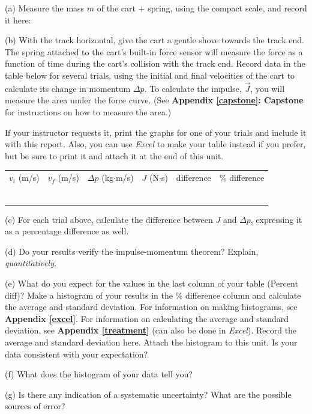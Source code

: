 (a) Measure the mass $m$ of the cart + spring, using the compact scale, and record it here:
\answerspace{10mm}

(b) With the track horizontal, give the cart a gentle shove towards the track end. The spring attached to the cart's built-in force sensor will measure the force as a function of time during the cart's collision with the track end. Record data in the table below for several trials, using the initial and final velocities of the cart to calculate its change in momentum $\Delta p$.  To calculate the impulse, ${\vec  J}$, you will measure the area under the force curve.  (See \textbf{Appendix \ref{capstone}: Capstone} for instructions on how to measure the area.)

If your instructor requests it, print the graphs for one of your trials and include it with this report.  Also, you can use {\it Excel} to make your table instead if you prefer, but be sure to print it and attach it at the end of this unit. 

\begin{center}
{\renewcommand{\arraystretch}{2.0}
\begin{tabular}{|c|c|c|C{0.8in}|c|C{1in}|} \hline 
$v_i$ (m/s) & $v_f$ (m/s) & $\Delta p$ (kg$\cdot$m/s) & $J$ (N$\cdot$s) & difference & \% difference \\ 
\hhline{|=|=|=|=|=|=|}
& & & & & \\ \hline 
& & & & & \\ \hline 
& & & & & \\ \hline 
& & & & & \\ \hline 
& & & & & \\ \hline 
& & & & & \\ \hline 
\end{tabular} }
\end{center}

(c) For each trial above, calculate the difference between $J$ and $\Delta p$, expressing it as a percentage difference as well.  


(d) Do your results verify the impulse-momentum theorem? Explain, \textit{quantitatively}.
\answerspace{1in}


\pagebreak
(e) What do you expect for the values in the last column of your table (Percent diff)? Make a histogram of your results in the \% difference column and calculate the average and standard deviation. For information on making histograms, see \textbf{Appendix \ref{excel}}. For information on calculating the average and standard deviation, see \textbf{Appendix \ref{treatment}} (can also be done in \textit{Excel}). Record the average and standard 
deviation here. Attach the histogram to this unit. Is your data consistent with your expectation?
\answerspace{25mm}

(f) What does the histogram of your data tell you?
\answerspace{25mm}

(g) Is there any indication of a systematic uncertainty? What are the possible
sources of error?
\answerspace{25mm}
